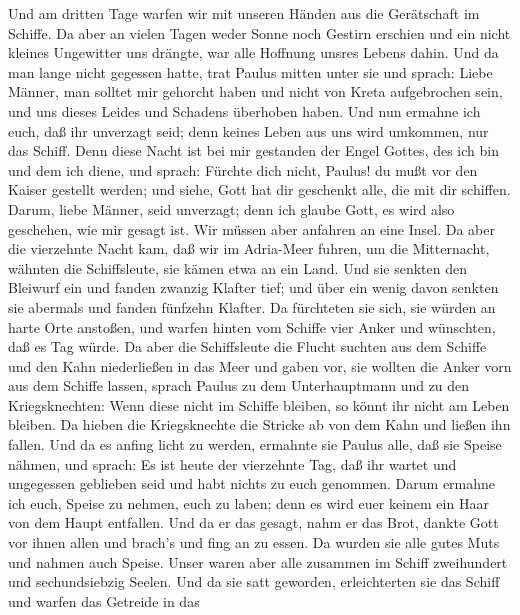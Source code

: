  Und am dritten Tage warfen wir mit unseren Händen aus die
Gerätschaft im Schiffe.  Da aber an vielen Tagen weder
Sonne noch Gestirn erschien und ein nicht kleines Ungewitter uns
drängte, war alle Hoffnung unsres Lebens dahin.  Und da man
lange nicht gegessen hatte, trat Paulus mitten unter sie und sprach:
Liebe Männer, man solltet mir gehorcht haben und nicht von Kreta
aufgebrochen sein, und uns dieses Leides und Schadens überhoben haben.
 Und nun ermahne ich euch, daß ihr unverzagt seid; denn
keines Leben aus uns wird umkommen, nur das Schiff.  Denn
diese Nacht ist bei mir gestanden der Engel Gottes, des ich bin und dem
ich diene,  und sprach: Fürchte dich nicht, Paulus! du mußt
vor den Kaiser gestellt werden; und siehe, Gott hat dir geschenkt alle,
die mit dir schiffen.  Darum, liebe Männer, seid unverzagt;
denn ich glaube Gott, es wird also geschehen, wie mir gesagt ist.
 Wir müssen aber anfahren an eine Insel.  Da
aber die vierzehnte Nacht kam, daß wir im Adria-Meer fuhren, um die
Mitternacht, wähnten die Schiffsleute, sie kämen etwa an ein Land.
 Und sie senkten den Bleiwurf ein und fanden zwanzig
Klafter tief; und über ein wenig davon senkten sie abermals und fanden
fünfzehn Klafter.  Da fürchteten sie sich, sie würden an
harte Orte anstoßen, und warfen hinten vom Schiffe vier Anker und
wünschten, daß es Tag würde.  Da aber die Schiffsleute die
Flucht suchten aus dem Schiffe und den Kahn niederließen in das Meer und
gaben vor, sie wollten die Anker vorn aus dem Schiffe lassen,
 sprach Paulus zu dem Unterhauptmann und zu den
Kriegsknechten: Wenn diese nicht im Schiffe bleiben, so könnt ihr nicht
am Leben bleiben.  Da hieben die Kriegsknechte die Stricke
ab von dem Kahn und ließen ihn fallen.  Und da es anfing
licht zu werden, ermahnte sie Paulus alle, daß sie Speise nähmen, und
sprach: Es ist heute der vierzehnte Tag, daß ihr wartet und ungegessen
geblieben seid und habt nichts zu euch genommen.  Darum
ermahne ich euch, Speise zu nehmen, euch zu laben; denn es wird euer
keinem ein Haar von dem Haupt entfallen.  Und da er das
gesagt, nahm er das Brot, dankte Gott vor ihnen allen und brach's und
fing an zu essen.  Da wurden sie alle gutes Muts und nahmen
auch Speise.  Unser waren aber alle zusammen im Schiff
zweihundert und sechundsiebzig Seelen.  Und da sie satt
geworden, erleichterten sie das Schiff und warfen das Getreide in das
